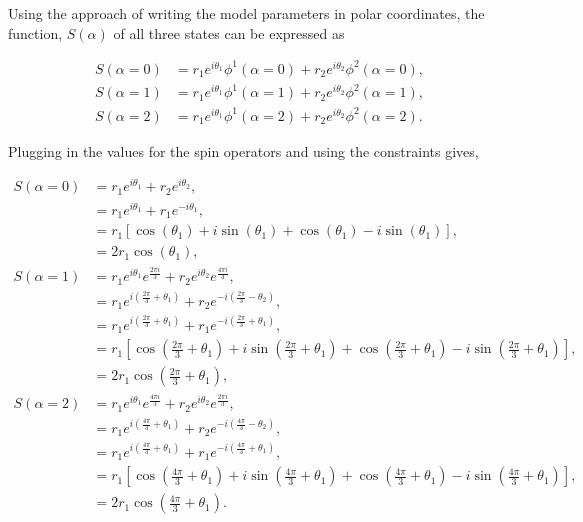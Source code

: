 \noindent
Using the approach of writing the model parameters in polar coordinates, the function, $S(\alpha)$ of all three states can be expressed as

\begin{align*}
    S(\alpha=0) &= r_1 e^{i \theta_1} \phi^1(\alpha=0) + r_2 e^{i \theta_2} \phi^2(\alpha=0),\\
    S(\alpha=1) &= r_1 e^{i \theta_1} \phi^1(\alpha=1) + r_2 e^{i \theta_2} \phi^2(\alpha=1),\\
    S(\alpha=2) &= r_1 e^{i \theta_1} \phi^1(\alpha=2) + r_2 e^{i \theta_2} \phi^2(\alpha=2).
\end{align*}

\noindent
Plugging in the values for the spin operators and using the constraints gives,

\begin{align*}
    S(\alpha=0) &= r_1 e^{i \theta_1} + r_2 e^{i \theta_2},\\
    &= r_1 e^{i \theta_1} + r_1 e^{-i \theta_1}, \\
    &= r_1 \left[ \cos\left( \theta_1 \right) + i \sin\left( \theta_1 \right) + \cos\left( \theta_1 \right) - i \sin\left( \theta_1 \right) \right],\\
    &= 2r_1 \cos\left( \theta_1 \right),\\
    S(\alpha=1) &= r_1 e^{i \theta_1} e^{\frac{2\pi i}{3}} + r_2 e^{i \theta_2} e^{\frac{4\pi i}{3}},\\
    &= r_1 e^{i\left( \frac{2\pi}{3} + \theta_1 \right)} + r_2 e^{-i \left(\frac{2\pi}{3} - \theta_2 \right)},\\
    &= r_1 e^{i\left( \frac{2\pi}{3} + \theta_1 \right)} + r_1 e^{-i \left(\frac{2\pi}{3} + \theta_1 \right)},\\
    &= r_1 \left[ \cos\left( \frac{2\pi}{3} + \theta_1 \right) + i \sin \left( \frac{2\pi}{3} + \theta_1 \right) + \cos\left( \frac{2\pi}{3} + \theta_1 \right) - i \sin \left( \frac{2\pi}{3} + \theta_1 \right) \right],\\
    &= 2 r_1 \cos\left( \frac{2\pi}{3} + \theta_1 \right),\\
    S(\alpha=2) &= r_1 e^{i \theta_1} e^{\frac{4\pi i}{3}} + r_2 e^{i \theta_2} e^{\frac{2\pi i}{3}},\\
    &= r_1 e^{i\left( \frac{4\pi}{3} + \theta_1 \right)} + r_2 e^{-i \left(\frac{4\pi}{3} - \theta_2 \right)},\\
    &= r_1 e^{i\left( \frac{4\pi}{3} + \theta_1 \right)} + r_1 e^{-i \left(\frac{4\pi}{3} + \theta_1 \right)},\\
    &= r_1 \left[ \cos\left( \frac{4\pi}{3} + \theta_1 \right) + i \sin \left( \frac{4\pi}{3} + \theta_1 \right) + \cos\left( \frac{4\pi}{3} + \theta_1 \right) - i \sin \left( \frac{4\pi}{3} + \theta_1 \right) \right],\\
    &= 2 r_1 \cos\left( \frac{4\pi}{3} + \theta_1 \right).
\end{align*}

